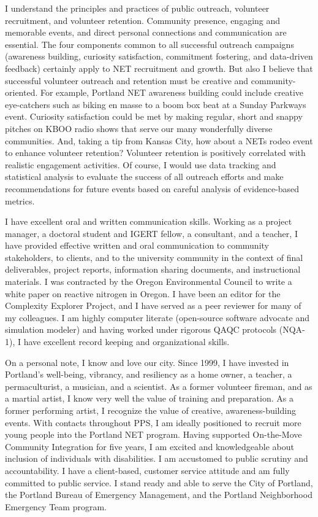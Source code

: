 \documentclass[11 pt,letterpaper]{moderncv}        %
\begin{document}
I understand the principles and practices of public outreach, volunteer recruitment, and volunteer retention. Community presence, engaging and memorable events, and direct personal connections and communication are essential. The four components common to all successful outreach campaigns (awareness building, curiosity satisfaction, commitment fostering, and data-driven feedback) certainly apply to NET recruitment and growth. But also I believe that successful volunteer outreach and retention must be creative and community-oriented. For example, Portland NET awareness building could include creative eye-catchers such as biking en masse to a boom box beat at a Sunday Parkways event. Curiosity satisfaction could be met by making regular, short and snappy pitches on KBOO radio shows that serve our many wonderfully diverse communities. And, taking a tip from Kansas City, how about a NETs rodeo event to enhance volunteer retention? Volunteer retention is positively correlated with realistic engagement activities. Of course, I would use data tracking and statistical analysis to evaluate the success of all outreach efforts and make recommendations for future events based on careful analysis of evidence-based metrics.

I have excellent oral and written communication skills. Working as a project manager, a doctoral student and IGERT fellow, a consultant, and a teacher, I have provided effective written and oral communication to community stakeholders, to clients, and to the university community in the context of final deliverables, project reports, information sharing documents, and instructional materials. I was contracted by the Oregon Environmental Council to write a white paper on reactive nitrogen in Oregon. I have been an editor for the Complexity Explorer Project, and I have served as a peer reviewer for many of my colleagues. I am highly computer literate (open-source software advocate and simulation modeler) and having worked under rigorous QAQC protocols (NQA-1), I have excellent record keeping and organizational skills. 

On a personal note, I know and love our city. Since 1999, I have invested in Portland’s well-being, vibrancy, and resiliency as a home owner, a teacher, a permaculturist, a musician, and a scientist. As a former volunteer fireman, and as a martial artist, I know very well the value of training and preparation. As a former performing artist, I recognize the value of creative, awareness-building events. With contacts throughout PPS, I am ideally positioned to recruit more young people into the Portland NET program. Having supported On-the-Move Community Integration for five years, I am excited and knowledgeable about inclusion of individuals with disabilities. I am accustomed to public scrutiny and accountability. I have a client-based, customer service attitude and am fully committed to public service. I stand ready and able to serve the City of Portland, the Portland Bureau of Emergency Management, and the Portland Neighborhood Emergency Team program. 
\end{document}
